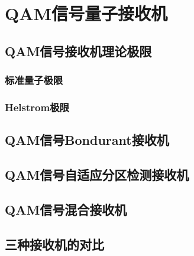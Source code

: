 \chapter{QAM信号量子接收机}

\section{QAM信号接收机理论极限}
\subsection{标准量子极限}

\subsection{Helstrom极限}


\section{QAM信号Bondurant接收机}


\section{QAM信号自适应分区检测接收机}


\section{QAM信号混合接收机}


\section{三种接收机的对比}


